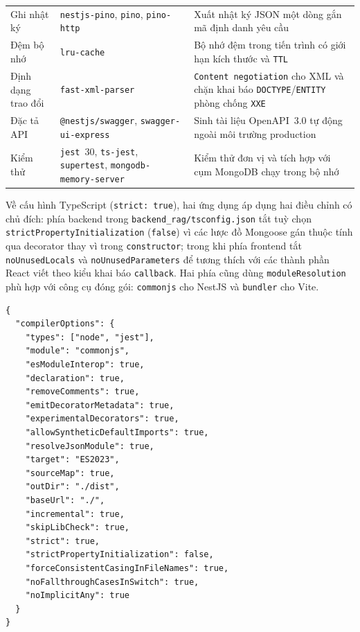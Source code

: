 \begin{longtable}{
  @{}>{\raggedright\arraybackslash}p{2.7cm}
  >{\raggedright\arraybackslash}p{5.5cm}
  >{\raggedright\arraybackslash}p{7.0cm}@{}
}
Ghi nhật ký & \texttt{nestjs-\allowbreak{}pino}, \texttt{pino}, \texttt{pino-\allowbreak{}http} & Xuất nhật ký JSON một dòng gắn mã định danh yêu cầu \\
Đệm bộ nhớ & \texttt{lru-\allowbreak{}cache} & Bộ nhớ đệm trong tiến trình có giới hạn kích thước và \texttt{TTL} \\
Định dạng trao đổi & \texttt{fast-\allowbreak{}xml-\allowbreak{}parser} & \texttt{Content negotiation} cho XML và chặn khai báo \texttt{DOCTYPE}/\texttt{ENTITY} phòng chống \texttt{XXE} \\
Đặc tả API & \texttt{@nestjs/\allowbreak{}swagger}, \texttt{swagger-\allowbreak{}ui-\allowbreak{}express} & Sinh tài liệu OpenAPI~3.0 tự động ngoài môi trường production \\
Kiểm thử & \texttt{jest}~30, \texttt{ts-\allowbreak{}jest}, \texttt{supertest}, \texttt{mongodb-\allowbreak{}memory-\allowbreak{}server} & Kiểm thử đơn vị và tích hợp với cụm MongoDB chạy trong bộ nhớ \\
\end{longtable}
\endgroup

Về cấu hình TypeScript (\texttt{strict: true}), hai ứng dụng áp dụng hai điều chỉnh có chủ đích: phía backend trong \texttt{backend\_\allowbreak{}rag/\allowbreak{}tsconfig.\allowbreak{}json} tắt tuỳ chọn \texttt{strictProperty\allowbreak{}Initialization} (\texttt{false}) vì các lược đồ Mongoose gán thuộc tính qua decorator thay vì trong \texttt{constructor}; trong khi phía frontend tắt \texttt{noUnused\allowbreak{}Locals} và \texttt{noUnused\allowbreak{}Parameters} để tương thích với các thành phần React viết theo kiểu khai báo \texttt{callback}. Hai phía cũng dùng \texttt{moduleResolution} phù hợp với công cụ đóng gói: \texttt{commonjs} cho NestJS và \texttt{bundler} cho Vite.

\begin{verbatim}
{
  "compilerOptions": {
    "types": ["node", "jest"],
    "module": "commonjs",
    "esModuleInterop": true,
    "declaration": true,
    "removeComments": true,
    "emitDecoratorMetadata": true,
    "experimentalDecorators": true,
    "allowSyntheticDefaultImports": true,
    "resolveJsonModule": true,
    "target": "ES2023",
    "sourceMap": true,
    "outDir": "./dist",
    "baseUrl": "./",
    "incremental": true,
    "skipLibCheck": true,
    "strict": true,
    "strictPropertyInitialization": false,
    "forceConsistentCasingInFileNames": true,
    "noFallthroughCasesInSwitch": true,
    "noImplicitAny": true
  }
}
\end{verbatim}

